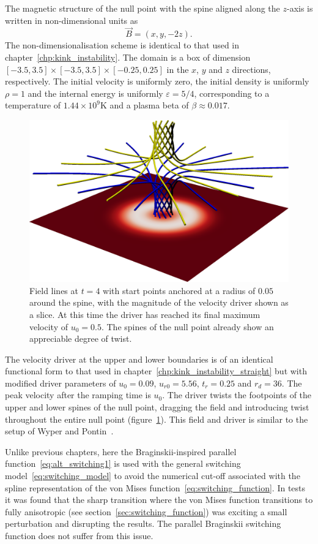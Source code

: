 The magnetic structure of the null point with the spine aligned along the $z$-axis is written in non-dimensional units as
\begin{equation}
  \label{eq:null_point_field}
  \vec{B} = (x, y, -2z).
\end{equation}
The non-dimensionalisation scheme is identical to that used in chapter~\ref{chp:kink_instability}. The domain is a box of dimension $[-3.5, 3.5]\times[-3.5, 3.5]\times [-0.25, 0.25] $ in the $x$, $y$ and $z$ directions, respectively. The initial velocity is uniformly zero, the initial density is uniformly $\rho = 1$ and the internal energy is uniformly $\varepsilon = 5/4$, corresponding to a temperature of $1.44 \times 10^9$K and a plasma beta of $\beta \approx 0.017$.

\begin{figure}[t]
  \centering
      \includegraphics[width=0.5\linewidth]{field_line_plots/cropped/v-4r-4-isotropic_0008_cropped.png}
  \caption{Field lines at $t=4$ with start points anchored at a radius of $0.05$ around the spine, with the magnitude of the velocity driver shown as a slice. At this time the driver has reached its final maximum velocity of $u_0 = 0.5$. The spines of the null point already show an appreciable degree of twist.}%
  \label{fig:field_line_plots/v-4r-4-iso-field-8}
\end{figure}

The velocity driver at the upper and lower boundaries is of an identical functional form to that used in chapter~\ref{chp:kink_instability_straight} but with modified driver parameters of $u_0 = 0.09$, $u_{r0} = 5.56$, $t_r = 0.25$ and $r_d = 36$. The peak velocity after the ramping time is $u_0$. The driver twists the footpoints of the upper and lower spines of the null point, dragging the field and introducing twist throughout the entire null point (figure~\ref{fig:field_line_plots/v-4r-4-iso-field-8}). This field and driver is similar to the setup of Wyper and Pontin~\cite{wyperKelvinHelmholtzInstabilityCurrentvortex2013}.

Unlike previous chapters, here the Braginskii-inspired parallel function~\ref{eq:alt_switching1} is used with the general switching model~\ref{eq:switching_model} to avoid the numerical cut-off associated with the spline representation of the von Mises function~\ref{eq:switching_function}. In tests it was found that the sharp transition where the von Mises function transitions to fully anisotropic (see section~\ref{sec:switching_function}) was exciting a small perturbation and disrupting the results. The parallel Braginskii switching function does not suffer from this issue.

